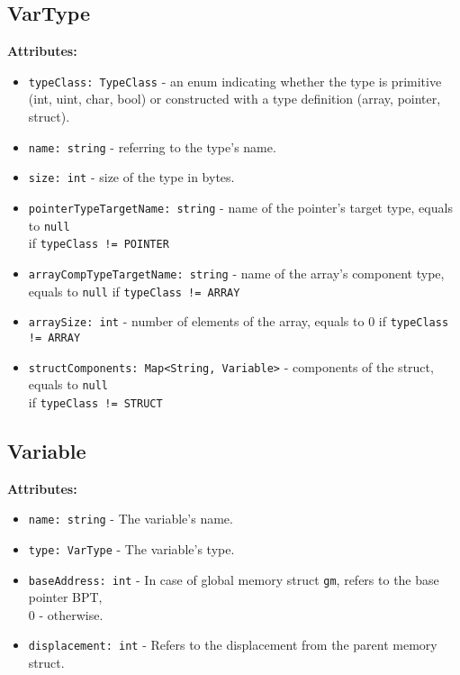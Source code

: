 \subsection{VarType}\label{subsec:vartype}
\textbf{Attributes:}
\begin{itemize}
    \item \verb+typeClass: TypeClass+ - an enum indicating whether the type is primitive (int, uint, char, bool) or constructed with
    a type definition (array, pointer, struct).
    \item \verb+name: string+ - referring to the type's name.
    \item \verb+size: int+ - size of the type in bytes.
    \item \verb+pointerTypeTargetName: string+ - name of the pointer's target type, equals to \verb+null+\\ if \verb+typeClass != POINTER+
    \item \verb+arrayCompTypeTargetName: string+ - name of the array's component type, equals to \verb+null+ if \verb+typeClass != ARRAY+
    \item \verb+arraySize: int+ - number of elements of the array, equals to 0 if \verb+typeClass != ARRAY+
    \item \verb+structComponents: Map<String, Variable>+ - components of the struct, equals to \verb+null+\\ if \verb+typeClass != STRUCT+
\end{itemize}

\subsection{Variable}\label{subsec:variable}
\textbf{Attributes:}
\begin{itemize}
    \item \verb+name: string+ - The variable's name.
    \item \verb+type: VarType+ - The variable's type.
    \item \verb+baseAddress: int+ - In case of global memory struct \verb+gm+, refers to the base pointer BPT,\\ 0 - otherwise.
    \item \verb+displacement: int+ - Refers to the displacement from the parent memory struct.
\end{itemize}

